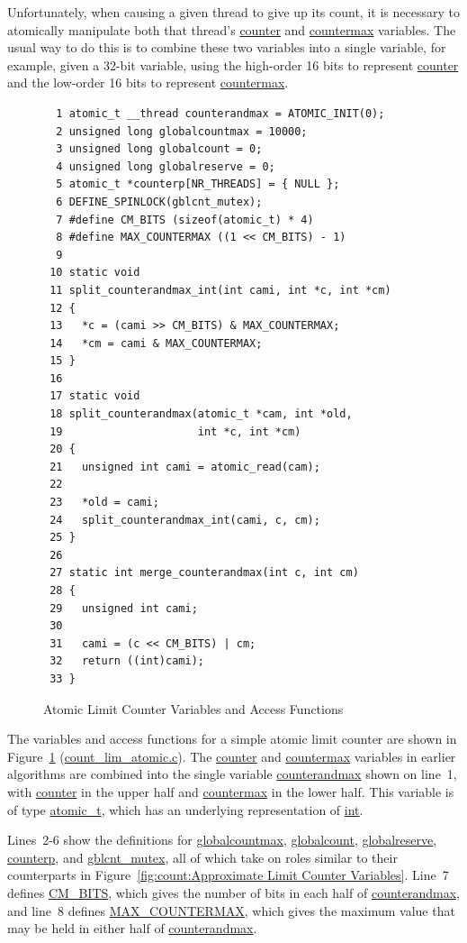 Unfortunately, when causing a given thread to give up its count, it is
necessary to atomically manipulate both that thread's \url{counter}
and \url{countermax} variables.
The usual way to do this is to combine these two variables into a
single variable,
for example, given a 32-bit variable, using the high-order 16 bits to
represent \url{counter} and the low-order 16 bits to represent
\url{countermax}.

\begin{figure}[tbp]
{ \scriptsize
\begin{verbatim}
  1 atomic_t __thread counterandmax = ATOMIC_INIT(0);
  2 unsigned long globalcountmax = 10000;
  3 unsigned long globalcount = 0;
  4 unsigned long globalreserve = 0;
  5 atomic_t *counterp[NR_THREADS] = { NULL };
  6 DEFINE_SPINLOCK(gblcnt_mutex);
  7 #define CM_BITS (sizeof(atomic_t) * 4)
  8 #define MAX_COUNTERMAX ((1 << CM_BITS) - 1)
  9 
 10 static void
 11 split_counterandmax_int(int cami, int *c, int *cm)
 12 {
 13   *c = (cami >> CM_BITS) & MAX_COUNTERMAX;
 14   *cm = cami & MAX_COUNTERMAX;
 15 }
 16 
 17 static void
 18 split_counterandmax(atomic_t *cam, int *old,
 19                     int *c, int *cm)
 20 {
 21   unsigned int cami = atomic_read(cam);
 22 
 23   *old = cami;
 24   split_counterandmax_int(cami, c, cm);
 25 }
 26 
 27 static int merge_counterandmax(int c, int cm)
 28 {
 29   unsigned int cami;
 30 
 31   cami = (c << CM_BITS) | cm;
 32   return ((int)cami);
 33 }
\end{verbatim}
}
\caption{Atomic Limit Counter Variables and Access Functions}
\label{fig:count:Atomic Limit Counter Variables and Access Functions}
\end{figure}

The variables and access functions for a simple atomic limit counter
are shown in
Figure~\ref{fig:count:Atomic Limit Counter Variables and Access Functions}
(\url{count_lim_atomic.c}).
The \url{counter} and \url{countermax} variables in earlier algorithms
are combined into the single variable \url{counterandmax} shown on
line~1, with \url{counter} in the upper half and \url{countermax} in
the lower half.
This variable is of type \url{atomic_t}, which has an underlying
representation of \url{int}.

Lines~2-6 show the definitions for \url{globalcountmax}, \url{globalcount},
\url{globalreserve}, \url{counterp}, and \url{gblcnt_mutex}, all of which
take on roles similar to their counterparts in
Figure~\ref{fig:count:Approximate Limit Counter Variables}.
Line~7 defines \url{CM_BITS}, which gives the number of bits in each half
of \url{counterandmax}, and line~8 defines \url{MAX_COUNTERMAX}, which
gives the maximum value that may be held in either half of
\url{counterandmax}.

